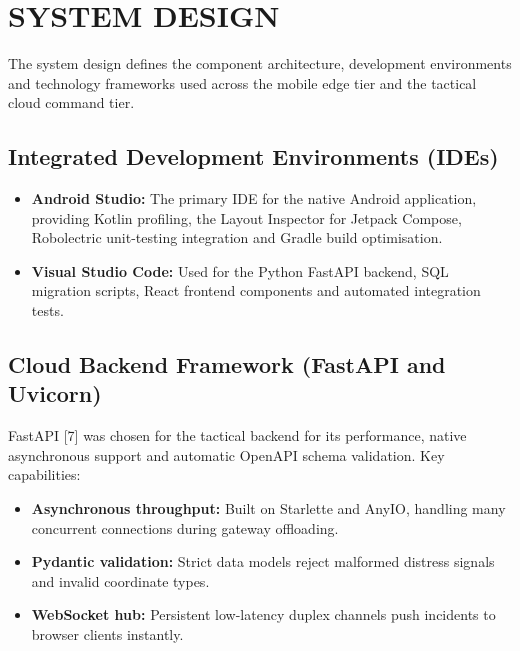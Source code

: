 \documentclass[12pt,a4paper]{report}
\begin{document}
\chapter{SYSTEM DESIGN}

The system design defines the component architecture, development environments and technology frameworks used across the mobile edge tier and the tactical cloud command tier.

\section{Integrated Development Environments (IDEs)}
\begin{itemize}
    \item \textbf{Android Studio:} The primary IDE for the native Android application, providing Kotlin profiling, the Layout Inspector for Jetpack Compose, Robolectric unit-testing integration and Gradle build optimisation.
    \item \textbf{Visual Studio Code:} Used for the Python FastAPI backend, SQL migration scripts, React frontend components and automated integration tests.
\end{itemize}

\section{Cloud Backend Framework (FastAPI and Uvicorn)}
FastAPI [7] was chosen for the tactical backend for its performance, native asynchronous support and automatic OpenAPI schema validation. Key capabilities:
\begin{itemize}
    \item \textbf{Asynchronous throughput:} Built on Starlette and AnyIO, handling many concurrent connections during gateway offloading.
    \item \textbf{Pydantic validation:} Strict data models reject malformed distress signals and invalid coordinate types.
    \item \textbf{WebSocket hub:} Persistent low-latency duplex channels push incidents to browser clients instantly.
\end{itemize}
\end{document}

